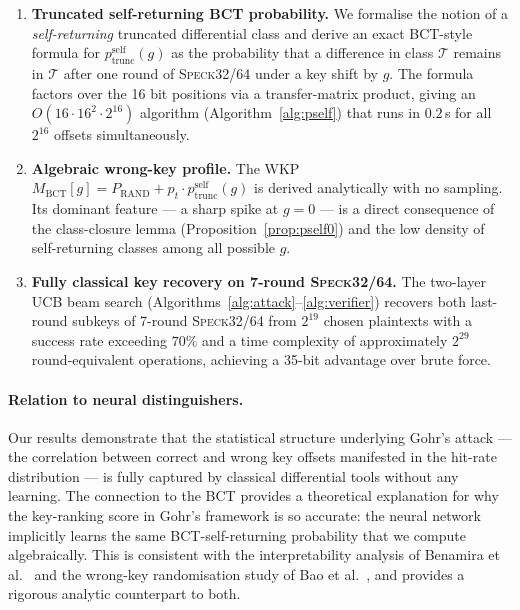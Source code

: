 \documentclass[runningheads]{llncs}
\newcommand{\pself}{p^{\mathrm{self}}_{\mathrm{trunc}}}
\newcommand{\speck}{\textsc{Speck}32/64}
\begin{document}
\begin{enumerate}
  \item \textbf{Truncated self-returning BCT probability.}
    We formalise the notion of a \emph{self-returning} truncated
    differential class and derive an exact BCT-style formula for
    $\pself(g)$ as the probability that a difference in class
    $\mathcal{T}$ remains in $\mathcal{T}$ after one round of \speck{}
    under a key shift by $g$.  The formula factors over the 16 bit
    positions via a transfer-matrix product, giving an $O(16 \cdot 16^2
    \cdot 2^{16})$ algorithm (Algorithm~\ref{alg:pself}) that runs in
    $0.2$\,s for all $2^{16}$ offsets simultaneously.

  \item \textbf{Algebraic wrong-key profile.}
    The WKP $M_{\mathrm{BCT}}[g] = P_{\mathrm{RAND}} + p_t \cdot
    \pself(g)$ is derived analytically with no sampling.  Its dominant
    feature — a sharp spike at $g = 0$ — is a direct consequence of the
    class-closure lemma (Proposition~\ref{prop:pself0}) and the low density of
    self-returning classes among all possible $g$.

  \item \textbf{Fully classical key recovery on 7-round \speck{}.}
    The two-layer UCB beam search (Algorithms~\ref{alg:attack}--\ref{alg:verifier}) recovers
    both last-round subkeys of 7-round \speck{} from $2^{19}$ chosen
    plaintexts with a success rate exceeding $70\%$ and a time complexity
    of approximately $2^{29}$ round-equivalent operations, achieving a
    35-bit advantage over brute force.
\end{enumerate}

\paragraph{Relation to neural distinguishers.}

Our results demonstrate that the statistical structure underlying Gohr's
attack — the correlation between correct and wrong key offsets manifested
in the hit-rate distribution — is fully captured by classical differential
tools without any learning.  The connection to the BCT provides a
theoretical explanation for why the key-ranking score in Gohr's framework
is so accurate: the neural network implicitly learns the same BCT-self-returning
probability that we compute algebraically.  This is consistent with the
interpretability analysis of Benamira et al.~\cite{BGMR23} and the
wrong-key randomisation study of Bao et al.~\cite{BLY23}, and provides a
rigorous analytic counterpart to both.
\end{document}
